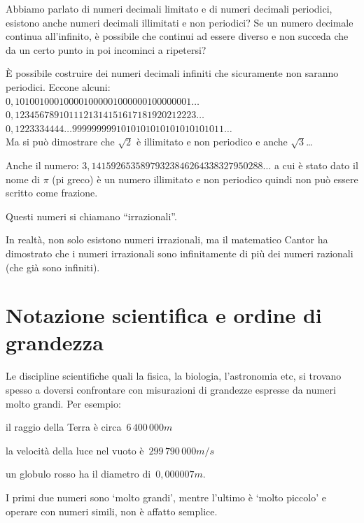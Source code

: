 \begin{osservazione}
 Abbiamo parlato di numeri decimali limitato e di numeri decimali
periodici, esistono anche numeri decimali illimitati e non periodici?
Se un numero decimale continua all'infinito, è possibile che continui ad
essere diverso e non succeda che da un certo punto in poi incominci a
ripetersi?

È possibile costruire dei numeri decimali infiniti che sicuramente non
saranno periodici. Eccone alcuni:\\
\(0,101001000100001000001000000100000001\dots\)\\
\(0,1234567891011121314151617181920212223\dots\)\\
\(0,1223334444\dots9999999991010101010101010101011\dots\)\\
Ma si può dimostrare che \(\sqrt{2}\) è illimitato e non periodico
e anche \(\sqrt{3}\)\dots

Anche il numero: \(3,14159265358979323846264338327950288\dots\) a cui è
stato dato il nome di \(\pi\) (pi greco) è un numero
illimitato e non periodico quindi non può essere scritto come frazione.

Questi numeri si chiamano ``irrazionali''.

In realtà, non solo esistono numeri irrazionali, ma il matematico Cantor ha
dimostrato che i numeri irrazionali sono infinitamente di più dei numeri
razionali (che già sono infiniti).
\end{osservazione}

\section{Notazione scientifica e ordine di grandezza}
\label{sec:razionali_notazione_scientifica}

Le discipline scientifiche quali la fisica, la biologia, l'astronomia etc,
si trovano spesso a doversi confrontare con misurazioni di grandezze
espresse
da numeri molto grandi. Per esempio:

\begin{itemize*}
\item il raggio della Terra è circa~\(6\,400\,000\unit{m}\)
\item la velocità della luce nel vuoto è~\(299\,790\,000\unit{m/s}\)
\item un globulo rosso ha il diametro di~\(0,000007\unit{m}\).
\end{itemize*}

I primi due numeri sono `molto grandi', mentre l'ultimo è `molto piccolo' e
operare con numeri simili, non è affatto semplice.

